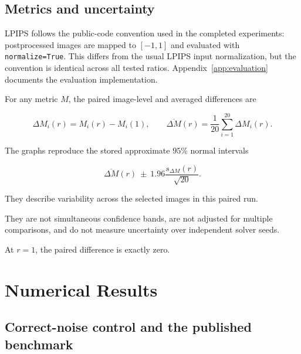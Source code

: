 \documentclass[11pt,a4paper]{article}
\begin{document}

\subsection{Metrics and uncertainty}


LPIPS follows the public-code convention used in the completed experiments:
postprocessed images are mapped to $[-1,1]$ and evaluated with
\texttt{normalize=True}. This differs from the usual LPIPS input
normalization, but the convention is identical across all tested ratios.
Appendix~\ref{app:evaluation} documents the evaluation implementation.

For any metric $M$, the paired image-level and averaged differences are

\begin{equation}
    \Delta M_i(r)
    =
    M_i(r)-M_i(1),
    \qquad
    \overline{\Delta M}(r)
    =
    \frac{1}{20}
    \sum_{i=1}^{20}
    \Delta M_i(r).
    \label{eq:paired}
\end{equation}

The graphs reproduce the stored approximate $95\%$
normal intervals

\begin{equation}
    \overline{\Delta M}(r)
    \ \pm\
    1.96
    \frac{s_{\Delta M}(r)}{\sqrt{20}}.
    \label{eq:ci}
\end{equation}

They describe variability across the selected images in this paired run.

They are not simultaneous confidence bands, are not adjusted for
multiple comparisons, and do not measure uncertainty over
independent solver seeds.

At $r=1$, the paired difference is exactly zero.



\section{Numerical Results}


\subsection{Correct-noise control and the published benchmark}
\end{document}
